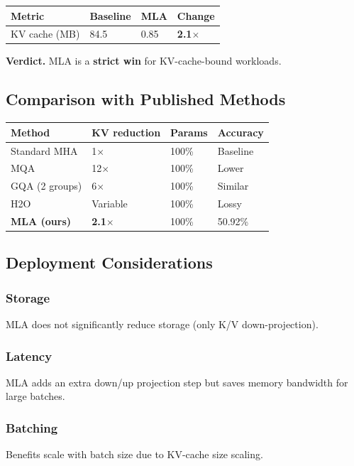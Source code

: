 \begin{table}[H]
\centering
\small
\begin{tabular}{llll}
\toprule
\textbf{Metric} & \textbf{Baseline} & \textbf{MLA} & \textbf{Change} \\
\midrule
KV cache (MB) & 84.5 & 0.85 & \textbf{2.1$\times$} \\
\bottomrule
\end{tabular}
\end{table}

\textbf{Verdict.} MLA is a \textbf{strict win} for KV-cache-bound workloads.

\subsection{Comparison with Published Methods}

\begin{table}[H]
\centering
\small
\begin{tabular}{llll}
\toprule
\textbf{Method} & \textbf{KV reduction} & \textbf{Params} & \textbf{Accuracy} \\
\midrule
Standard MHA & 1$\times$ & 100\% & Baseline \\
MQA & 12$\times$ & 100\% & Lower \\
GQA (2 groups) & 6$\times$ & 100\% & Similar \\
H2O & Variable & 100\% & Lossy \\
\textbf{MLA (ours)} & \textbf{2.1$\times$} & 100\% & 50.92\% \\
\bottomrule
\end{tabular}
\end{table}

\subsection{Deployment Considerations}

\subsubsection{Storage}
MLA does not significantly reduce storage (only K/V down-projection).

\subsubsection{Latency}
MLA adds an extra down/up projection step but saves memory bandwidth 
for large batches.

\subsubsection{Batching}
Benefits scale with batch size due to KV-cache size scaling.

